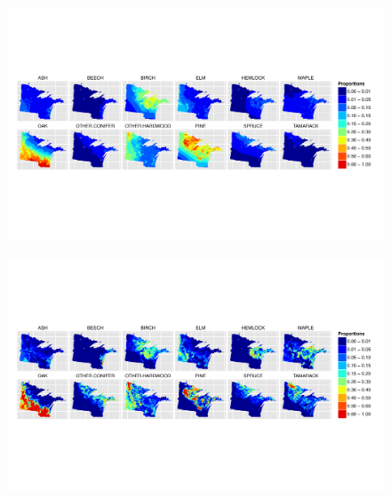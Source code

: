 \begin{figure}
\centering
\includegraphics[width=7in]{figures/maps_pollen.pdf}
\caption{}
\label{fig:maps_pollen}
\end{figure}

\begin{figure}
\centering
\includegraphics[width=7in]{figures/maps_veg.pdf}
\caption{}
\label{fig:maps_pollen}
\end{figure}





